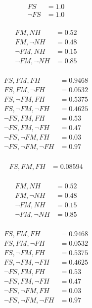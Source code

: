 \documentclass[12pt]{article}
\begin{document}
\problemsub
\begin{align*}
FS &= 1.0 \\
\lnot FS &= 1.0 \\
\end{align*}

\begin{align*}
FM, NH &= 0.52 \\
FM, \lnot NH &= 0.48 \\
\lnot FM, NH &= 0.15 \\
\lnot FM, \lnot NH &= 0.85 \\
\end{align*}

\begin{align*}
FS, FM, FH &= 0.9468 \\
FS, FM, \lnot FH &= 0.0532 \\
FS, \lnot FM, FH &= 0.5375 \\
FS, \lnot FM, \lnot FH &= 0.4625 \\
\lnot FS, FM, FH &= 0.53 \\
\lnot FS, FM, \lnot FH &= 0.47 \\
\lnot FS, \lnot FM, FH &= 0.03 \\
\lnot FS, \lnot FM, \lnot FH &= 0.97 \\
\end{align*}

\begin{align*}
FS, FM, FH &= 0.08594 \\
\end{align*}



\newpage
\problemsub
\begin{align*}
FM, NH &= 0.52 \\
FM, \lnot NH &= 0.48 \\
\lnot FM, NH &= 0.15 \\
\lnot FM, \lnot NH &= 0.85 \\
\end{align*}

\begin{align*}
FS, FM, FH &= 0.9468 \\
FS, FM, \lnot FH &= 0.0532 \\
FS, \lnot FM, FH &= 0.5375 \\
FS, \lnot FM, \lnot FH &= 0.4625 \\
\lnot FS, FM, FH &= 0.53 \\
\lnot FS, FM, \lnot FH &= 0.47 \\
\lnot FS, \lnot FM, FH &= 0.03 \\
\lnot FS, \lnot FM, \lnot FH &= 0.97 \\
\end{align*}
\end{document}
